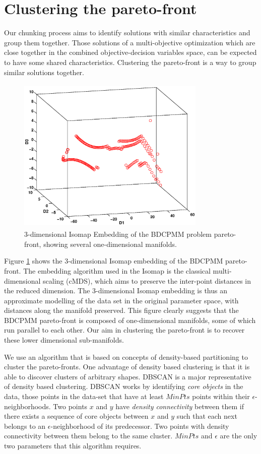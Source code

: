 \section{Clustering the pareto-front}
Our chunking process aims to identify solutions with similar
characteristics and group them together. Those solutions of a
multi-objective optimization which are close together in the combined
objective-decision variables space, can be expected to have some shared
characteristics. Clustering the pareto-front is a way to group similar
solutions together.

\begin{figure}[ht]
  \begin{center}
    \includegraphics[width=90mm, height=75mm]{dia/bdcpmiso3.eps} 
    \caption{3-dimensional Isomap Embedding of the BDCPMM problem
      pareto-front, showing several one-dimensional manifolds.}
    \label{bdcpmiso3}
  \end{center}
\end{figure}

Figure \ref{bdcpmiso3} shows the 3-dimensional Isomap embedding of the
BDCPMM pareto-front. The embedding algorithm used in the Isomap is the
classical multi-dimensional scaling (cMDS), which aims to preserve the
inter-point distances in the reduced dimension. The 3-dimensional Isomap
embedding is thus an approximate modelling of the data set in the original
parameter space, with distances along the manifold preserved. This figure
clearly suggests that the BDCPMM pareto-front is composed of
one-dimensional manifolds, some of which run parallel to each other. Our
aim in clustering the pareto-front is to recover these lower dimensional
sub-manifolds.

We use an algorithm that is based on concepts of density-based partitioning
to cluster the pareto-fronts. One advantage of density based clustering is
that it is able to discover clusters of arbitrary shapes. DBSCAN is a major
representative of density based clustering.  DBSCAN works by identifying
\emph{core objects} in the data, those points in the data-set that have
at least $MinPts$ points within their $\epsilon$-neighborhoods. Two points
$x$ and $y$ have \emph{density connectivity} between them if there exists a
sequence of core objects between $x$ and $y$ such that each next belongs to
an $\epsilon$-neighborhood of its predecessor. Two points with density
connectivity between them belong to the same cluster. $MinPts$ and
$\epsilon$ are the only two parameters that this algorithm requires.

